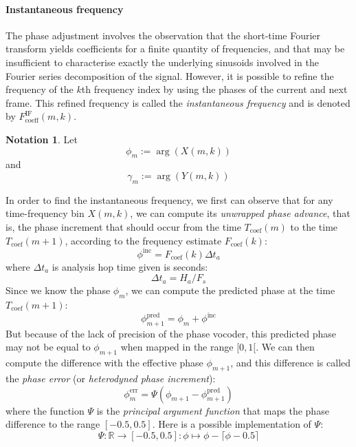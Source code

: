 \documentclass[letterpaper]{article}
\theoremstyle{definition}
\newtheorem*{notation}{Notation}
\theoremstyle{remark}
\begin{document}
\paragraph{Instantaneous frequency}
The phase adjustment involves the observation that the short-time Fourier
transform yields coefficients for a finite quantity of frequencies, and that may
be insufficient to characterise exactly the underlying sinusoids involved in the
Fourier series decomposition of the signal. However, it is possible to refine
the frequency of the \(k\)th frequency index by using the phases of the current
and next frame. This refined frequency is called the \emph{instantaneous
frequency} and is denoted by \(F_{\text{coeff}}^{\text{IF}}(m,k)\).
\begin{notation}
Let \[\phi_m:=\arg(X(m,k))\]
and \[\gamma_m:=\arg(Y(m,k))\]
\end{notation}
In order to find the instantaneous frequency, we first can observe that for any
time-frequency bin \(X(m,k)\), we can compute its \emph{unwrapped phase
advance}, that is, the phase increment that should occur from the time
\(T_{\text{coef}}(m)\) to the time \(T_{\text{coef}}(m+1)\), according to the
frequency estimate \(F_{\text{coef}}(k)\):
\begin{equation}
	\phi^{\text{inc}}=F_{\text{coef}}(k) \Delta t_a
\end{equation}
where \(\Delta t_a\) is analysis hop time given is seconds:
\begin{equation}
	\Delta t_a=H_a/F_s
\end{equation}
Since we know the phase \(\phi_m\), we can compute the predicted phase at
the time \(T_{\text{coef}}(m+1)\):
\begin{equation}
	\phi^{\text{pred}}_{m+1}=\phi_m + \phi^{\text{inc}}
\end{equation}
But because of the lack of precision of the phase vocoder, this predicted phase
may not be equal to \(\phi_{m+1}\) when mapped in the range \([0, 1[\).
We can then compute the difference with the effective phase \(\phi_{m+1}\), and
this difference is called the \emph{phase error} (or \emph{heterodyned phase
increment}):
\begin{equation}
	\phi^{\text{err}}_m=\Psi(\phi_{m+1} - \phi^{\text{pred}}_{m+1})
\end{equation}
where the function \(\Psi\) is the \emph{principal argument function} that maps
the phase difference to the range \([-0.5, 0.5]\).
Here is a possible implementation of \(\Psi\):
\begin{equation}
	\Psi:\mathbb{R}\to[-0.5,0.5]:\phi\mapsto \phi - \lceil \phi-0.5 \rceil
\end{equation}
\end{document}
